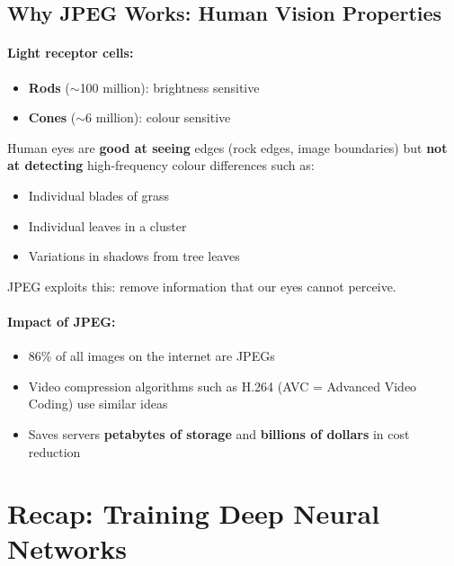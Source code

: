 \documentclass[12pt,a4paper]{article}
\begin{document}
\subsection{Why JPEG Works: Human Vision Properties}

\paragraph{Light receptor cells:}
\begin{itemize}
  \item \textbf{Rods} ($\sim$100 million): brightness sensitive
  \item \textbf{Cones} ($\sim$6 million): colour sensitive
\end{itemize}

Human eyes are \textbf{good at seeing} edges (rock edges, image boundaries) but \textbf{not at detecting} high-frequency colour differences such as:
\begin{itemize}
  \item Individual blades of grass
  \item Individual leaves in a cluster
  \item Variations in shadows from tree leaves
\end{itemize}

JPEG exploits this: remove information that our eyes cannot perceive.

\paragraph{Impact of JPEG:}
\begin{itemize}
  \item 86\% of all images on the internet are JPEGs
  \item Video compression algorithms such as H.264 (AVC = Advanced Video Coding) use similar ideas
  \item Saves servers \textbf{petabytes of storage} and \textbf{billions of dollars} in cost reduction
\end{itemize}

\section{Recap: Training Deep Neural Networks}
\end{document}
